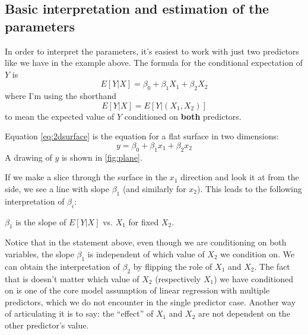 \subsection{Basic interpretation and estimation of the parameters }
 In order to interpret the parameters, it's easiest to work with just two predictors like we have in the example above. The formula for the conditional expectation of $Y$ is 
\begin{equation}\label{eq:2dsurface}
E[Y|X] = \beta_0 + \beta_1X_1 + \beta_2X_2
\end{equation}
where I'm using the shorthand 
\begin{equation*}
E[Y|X] = E[Y|(X_1,X_2)]
\end{equation*}
to mean the expected value of $Y$ conditioned on {\bf both} predictors. 



Equation \ref{eq:2dsurface} is the equation for a flat surface in two dimensions: 
\begin{equation}
y = \beta_0 + \beta_1x_1 + \beta_2x_2
\end{equation}
A drawing of $y$ is shown in \ref{fig:plane}. 

 If we make a slice through the surface in the $x_1$ direction and look it at from the side, we see a line with slope $\beta_1$ (and similarly for $x_2$).  This leads to the following interpretation of $\beta_i$:  
 \begin{center}
 $\beta_1$ is the slope of $E[Y|X]$ vs. $X_1$ for fixed $X_2$. 
 \end{center}
Notice that in the statement above, even though we are conditioning on both variables, the slope $\beta_1$ is independent of which value of $X_2$ we condition on. We can obtain the interpretation of $\beta_2$ by flipping the role of $X_1$ and $X_2$. 
The fact that is doesn't matter which value of $X_2$ (respectively $X_1$) we have conditioned on is one of the core model assumption of linear regression with multiple predictors, which we do not encounter in the single predictor case. Another way of articulating it is to say: the ``effect'' of $X_1$ and $X_2$ are not dependent on the other predictor's value.





